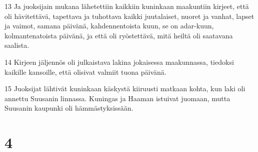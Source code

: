 \par 13 Ja juoksijain mukana lähetettiin kaikkiin kuninkaan maakuntiin kirjeet, että oli hävitettävä, tapettava ja tuhottava kaikki juutalaiset, nuoret ja vanhat, lapset ja vaimot, samana päivänä, kahdennentoista kuun, se on adar-kuun, kolmantenatoista päivänä, ja että oli ryöstettävä, mitä heiltä oli saatavana saalista.
\par 14 Kirjeen jäljennös oli julkaistava lakina jokaisessa maakunnassa, tiedoksi kaikille kansoille, että olisivat valmiit tuona päivänä.
\par 15 Juoksijat lähtivät kuninkaan käskystä kiiruusti matkaan kohta, kun laki oli annettu Suusanin linnassa. Kuningas ja Haaman istuivat juomaan, mutta Suusanin kaupunki oli hämmästyksissään.

\chapter{4}

